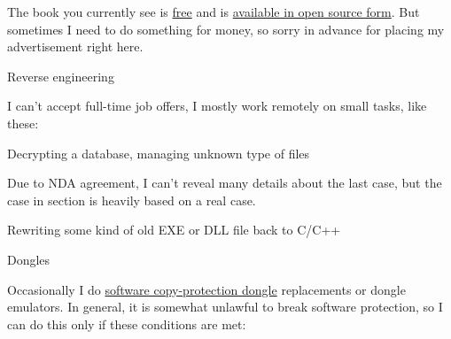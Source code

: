 \vspace*{\fill}

\iffalse
\huge
	Please take short survey
\normalsize

\bigskip
\bigskip
\bigskip

\dots here: \url{https://beginners.re/survey.html}.
This can be very helpful to author!

\bigskip
\bigskip
\bigskip
\fi

\huge
\normalsize

\bigskip
\bigskip
\bigskip


The book you currently see is \href{http://beginners.re/}{free} and is \href{https://github.com/dennis714/RE-for-beginners/}{available in open source form}.
But sometimes I need to do something for money, so sorry in advance for placing my advertisement right here.

\iffalse
\Large Need documentation? \normalsize

I could try to write a documentation/reference/manual for some API, language, framework, etc.

Sometimes I'm good at finding concise and clear example for each API/language feature.
This book is an example of it.
I can try to do this in long and steady fashion.

On the other side, my English is far from fluent.
And I may need a long time for diving deep into product unknown to me.

But I'll glad to rework existing documentation project.

Example of reference I admire is Wolfram Mathematica one: \url{http://reference.wolfram.com/language/}.
\fi

\Large Reverse engineering \normalsize

I can't accept full-time job offers, I mostly work remotely on small tasks, like these:

\large Decrypting a database, managing unknown type of files \normalsize

Due to NDA agreement, I can't reveal many details about the last case, but the case in  section
is heavily based on a real case.

\large Rewriting some kind of old EXE or DLL file back to C/C++ \normalsize

\large Dongles \normalsize

Occasionally I do \href{https://en.wikipedia.org/wiki/Software_protection_dongle}{software copy-protection dongle} replacements or dongle emulators. In general, it is somewhat unlawful to break software protection, so I can do this only if these conditions are met:

